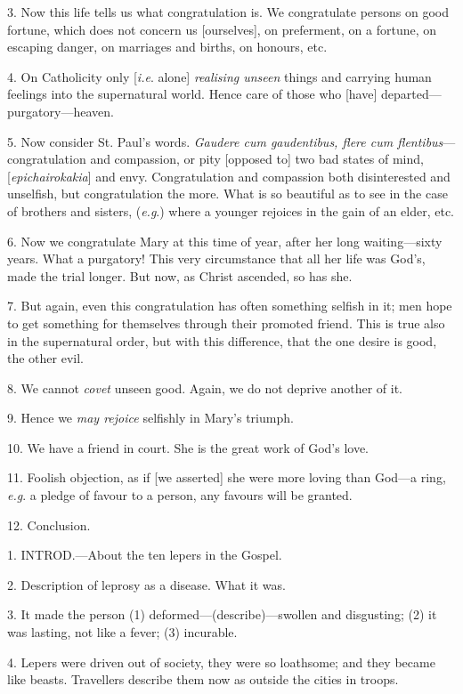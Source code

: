 3. Now this life tells us what congratulation is.
We congratulate persons on good fortune, which does not concern us
[ourselves], on preferment, on a fortune, on escaping danger, on
marriages and births, on honours, etc.

4. On Catholicity only [\emph{i.e}. alone] \emph{realising
unseen} things and carrying human feelings into the supernatural
world. Hence care of those who [have] departed—purgatory—heaven.

5. Now consider St. Paul's words. \emph{Gaudere cum
gaudentibus, flere cum flentibus}—congratulation and compassion,
or pity [opposed to] two bad states of mind, [\emph{epichairokakia}]
and envy. Congratulation and compassion both disinterested and
unselfish, but congratulation the more. What is so beautiful as to see
in the case of brothers and sisters, (\emph{e.g}.) where a younger
rejoices in the gain of an elder, etc.

6. Now we congratulate Mary at this time of year, after her long waiting—sixty years. What a purgatory! This
very circumstance that all her life was God's, made the trial longer.
But now, as Christ ascended, so has she.

7. But again, even this congratulation has often
something selfish in it; men hope to get something for themselves
through their promoted friend. This is true also in the supernatural
order, but with this difference, that the one desire is good, the
other evil.

8. We cannot \emph{covet} unseen good. Again, we
do not deprive another of it.

9. Hence we \emph{may rejoice} selfishly in Mary's
triumph.

10. We have a friend in court. She is the great
work of God's love.

11. Foolish objection, as if [we asserted] she
were more loving than God—a ring, \emph{e.g}. a pledge of favour to
a person, any favours will be granted.

12. Conclusion.


1. INTROD.—About
the ten lepers in the Gospel.

2. Description of leprosy as a disease. What it
was.

3. It made the person (1)
deformed—(describe)—swollen and disgusting; (2) it was lasting,
not like a fever; (3) incurable.

4. Lepers were driven out of society, they were
so loathsome; and they became like beasts. Travellers describe them
now as outside the cities in troops.

